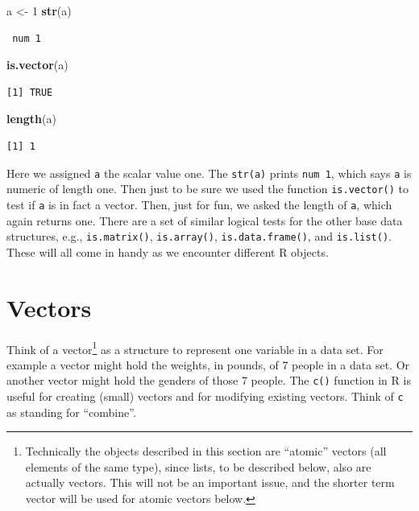 \documentclass[
]{krantz}
\makeatletter
\newenvironment{Shaded}{\begin{snugshade}}{\end{snugshade}}
\newcommand{\DecValTok}[1]{\textcolor[rgb]{0.06,0.06,0.06}{#1}}
\newcommand{\KeywordTok}[1]{\textcolor[rgb]{0.27,0.27,0.27}{\textbf{#1}}}
\newcommand{\NormalTok}[1]{#1}
\newcommand{\StringTok}[1]{\textcolor[rgb]{0.5,0.5,0.5}{#1}}
\newenvironment{kframe}{%
\medskip{}
\setlength{\fboxsep}{.8em}
 \def\at@end@of@kframe{}%
 \ifinner\ifhmode%
  \def\at@end@of@kframe{\end{minipage}}%
  \begin{minipage}{\columnwidth}%
 \fi\fi%
 \def\FrameCommand##1{\hskip\@totalleftmargin \hskip-\fboxsep
 \colorbox{shadecolor}{##1}\hskip-\fboxsep
     \hskip-\linewidth \hskip-\@totalleftmargin \hskip\columnwidth}%
 \MakeFramed {\advance\hsize-\width
   \@totalleftmargin\z@ \linewidth\hsize
   \@setminipage}}%
 {\par\unskip\endMakeFramed%
 \at@end@of@kframe}
\renewenvironment{Shaded}{\begin{kframe}}{\end{kframe}}
\makeatother
\begin{document}
\begin{Shaded}
\begin{Highlighting}[]
\NormalTok{a \textless{}{-}}\StringTok{ }\DecValTok{1}
\KeywordTok{str}\NormalTok{(a)}
\end{Highlighting}
\end{Shaded}

\begin{verbatim}
 num 1
\end{verbatim}

\begin{Shaded}
\begin{Highlighting}[]
\KeywordTok{is.vector}\NormalTok{(a)}
\end{Highlighting}
\end{Shaded}

\begin{verbatim}
[1] TRUE
\end{verbatim}

\begin{Shaded}
\begin{Highlighting}[]
\KeywordTok{length}\NormalTok{(a)}
\end{Highlighting}
\end{Shaded}

\begin{verbatim}
[1] 1
\end{verbatim}

Here we assigned \texttt{a} the scalar value one. The \texttt{str(a)} prints \texttt{num\ 1}, which says \texttt{a} is numeric of length one. Then just to be sure we used the function \texttt{is.vector()} to test if \texttt{a} is in fact a vector. Then, just for fun, we asked the length of \texttt{a}, which again returns one. There are a set of similar logical tests for the other base data structures, e.g., \texttt{is.matrix()}, \texttt{is.array()}, \texttt{is.data.frame()}, and \texttt{is.list()}. These will all come in handy as we encounter different R objects.

\hypertarget{vector}{%
\section{Vectors}\label{vector}}

Think of a vector\footnote{Technically the objects described in this section are ``atomic'' vectors (all elements of the same type), since lists, to be described below, also are actually vectors. This will not be an important issue, and the shorter term vector will be used for atomic vectors below.} as a structure to represent one variable in a data set. For example a vector might hold the weights, in pounds, of 7 people in a data set. Or another vector might hold the genders of those 7 people. The \texttt{c()} function in R is useful for creating (small) vectors and for modifying existing vectors. Think of \texttt{c} as standing for ``combine''.
\end{document}
